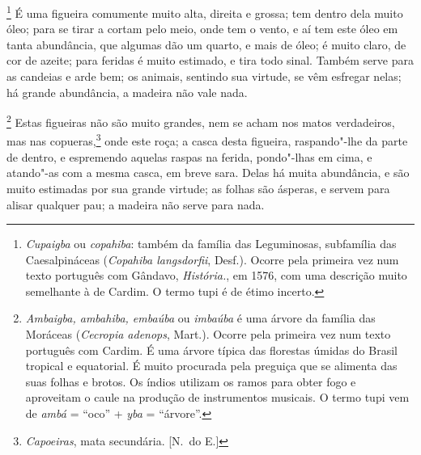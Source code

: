 \footnote{ \textit{Cupaigba} ou \textit{copahiba}: 
também da família das Leguminosas, subfamília das Caesalpináceas
(\textit{Copahiba langsdorfii}, Desf.). Ocorre pela primeira vez num
texto português com Gândavo, \textit{História.}, em 1576, com uma
descrição muito semelhante à de Cardim. O termo tupi é de étimo
incerto.} É uma figueira comumente muito alta, direita e
grossa; tem dentro dela muito óleo; para se tirar a cortam pelo meio,
onde tem o vento, e aí tem este óleo em tanta abundância, que algumas
dão um quarto, e mais de óleo; é muito claro, de cor de azeite; para
feridas é muito estimado, e tira todo sinal. Também serve para as
candeias e arde bem; os animais, sentindo sua virtude, se vêm esfregar
nelas; há grande abundância, a madeira não vale nada.

\footnote{ \textit{Ambaigba, ambahiba, embaúba} ou
 \textit{imbaúba} é uma árvore da família das Moráceas
(\textit{Cecropia adenops}, Mart.). Ocorre pela primeira vez num texto
português com Cardim. É uma árvore típica das florestas úmidas do
Brasil tropical e equatorial. É muito procurada pela preguiça que se
alimenta das suas folhas e brotos. Os índios utilizam os ramos para
obter fogo e aproveitam o caule na produção de instrumentos musicais. O
termo tupi vem de \textit{ambá} = ``oco'' + \textit{yba} = ``árvore''.} 
Estas figueiras não são muito grandes, nem se
acham nos matos verdadeiros, mas nas copueras,\footnote{ \textit{Capoeiras}, mata secundária. [N.~do E.]} onde este roça; a casca 
desta figueira, raspando"-lhe da parte de dentro, e espremendo aquelas
raspas na ferida, pondo"-lhas em cima, e atando"-as com a mesma casca,
em breve sara. Delas há muita abundância, e são muito estimadas por sua
grande virtude; as folhas são ásperas, e servem para alisar qualquer
pau; a madeira não serve para nada.


